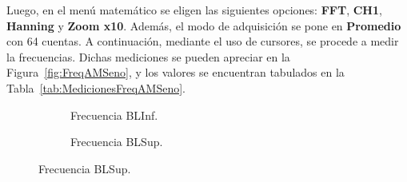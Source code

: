       Luego, en el menú matemático se eligen las siguientes opciones: \textbf{FFT}, \textbf{CH1},
      \textbf{Hanning} y \textbf{Zoom x10}. Además, el modo de adquisición se pone en \textbf{Promedio} con 
      64 cuentas. A continuación, mediante el uso de cursores, se procede a medir la frecuencias. Dichas mediciones se 
      pueden apreciar en la Figura~\ref{fig:FreqAMSeno}, y los valores se encuentran tabulados en la 
      Tabla~\ref{tab:MedicionesFreqAMSeno}.

      \begin{figure}[H]
        \centering
        \begin{subfigure}[H]{0.48\textwidth}
          \caption{Frecuencia BLInf.}
          \label{fig:FreqBLInfAMSeno}
        \end{subfigure}
        \hfill 
        \begin{subfigure}[H]{0.48\textwidth}
          \caption{Frecuencia BLSup.}
          \label{fig:FreqBLSupAMSeno}
        \end{subfigure}
      

\end{figure}
